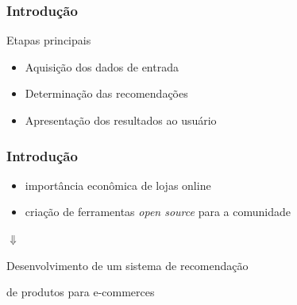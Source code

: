 \begin{frame}
\frametitle{Introdução}
\begin{block}{Etapas principais}
\begin{itemize}
	\item Aquisição dos dados de entrada
	\item Determinação das recomendações
	\item Apresentação dos resultados ao usuário
\end{itemize}
\end{block}
\end{frame}

\begin{frame}
\frametitle{Introdução}
\begin{itemize}
	\item importância econômica de lojas online
	\item criação de ferramentas \textit{open source} para a comunidade
\end{itemize}

\begin{center}
$\Downarrow$ 
\end{center}

\begin{center}
Desenvolvimento de um sistema de recomendação \par{} de produtos para e-commerces
\end{center}

\end{frame}
